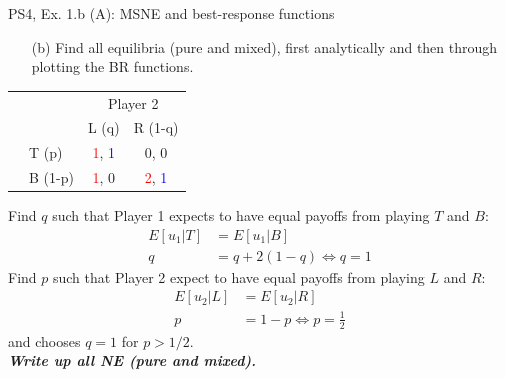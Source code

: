 \begin{frame}{PS4, Ex. 1.b (A): MSNE and best-response functions}
  \begin{multicols}{2}
    \begin{itemize}
      \item[(b)] Find all equilibria (pure and mixed), first analytically and then through plotting the BR functions.
    \end{itemize}
    \begin{table}
      \begin{tabular}{cl|c|c|}
        & \multicolumn{1}{c}{} & \multicolumn{2}{c}{\color{blue}Player 2}\\
        \parbox[t]{1mm}{}
        &  &  &  \\
        & T (p) & \textcolor{red}{1}, \textcolor{blue}{1} & 0, 0 \\
        & B (1-p) & \textcolor{red}{1}, 0 & \textcolor{red}{2}, \textcolor{blue}{1} \\
      \end{tabular}
    \end{table}
    Find $q$ such that Player 1 expects to have equal payoffs from playing $T$ and $B$:
    \begin{align*}
      E[u_1|T]&=E[u_1|B]\\
      q &= q + 2(1-q) \Leftrightarrow q = 1
    \end{align*}
    Find $p$ such that Player 2 expect to have equal payoffs from playing $L$ and $R$:
    \begin{align*}
      E[u_2|L]&=E[u_2|R]\\
      p &= 1-p \Leftrightarrow p = \frac{1}{2}
    \end{align*}
    and chooses $q=1$ for $p>1/2$.\\\medskip
    \textbf{\textit{Write up all NE (pure and mixed).}}
  \vfill\null \columnbreak
  \vfill\null
  \end{multicols}
\end{frame}
